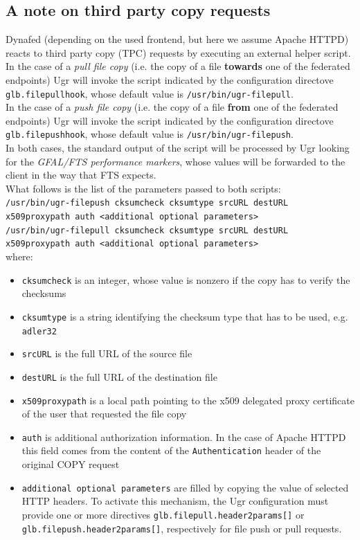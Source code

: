 \documentclass[12pt]{article} %
\begin{document}
\subsection{\label{noteonTPC}A note on third party copy requests}
Dynafed (depending on the used frontend, but here we assume Apache HTTPD) reacts to third party copy (TPC) requests by
executing an external helper script.\\
In the case of a \textit{pull file copy} (i.e. the copy of a file \textbf{towards} one of the federated endpoints) Ugr will invoke the script
indicated by the configuration directove \lstinline"glb.filepullhook", whose default value is \lstinline"/usr/bin/ugr-filepull".\\
In the case of a \textit{push file copy} (i.e. the copy of a file \textbf{from} one of the federated endpoints) Ugr will invoke the script
indicated by the configuration directove \lstinline"glb.filepushhook", whose default value is \lstinline"/usr/bin/ugr-filepush".\\
In both cases, the standard output of the script will be processed by Ugr looking for the \textit{GFAL/FTS performance markers}, whose
values will be forwarded to the client in the way that FTS expects.\\
What follows is the list of the parameters passed to both scripts:\\
\lstinline"/usr/bin/ugr-filepush cksumcheck cksumtype srcURL destURL x509proxypath auth <additional optional parameters>"\\
\lstinline"/usr/bin/ugr-filepull cksumcheck cksumtype srcURL destURL x509proxypath auth <additional optional parameters>"\\
where:\\
\begin{itemize}
 \item \lstinline"cksumcheck" is an integer, whose value is nonzero if the copy has to verify the checksums
 \item \lstinline"cksumtype" is a string identifying the checksum type that has to be used, e.g. \lstinline"adler32"
 \item \lstinline"srcURL" is the full URL of the source file
 \item \lstinline"destURL" is the full URL of the destination file
 \item \lstinline"x509proxypath" is a local path pointing to the x509 delegated proxy certificate of the user that requested the file copy
 \item \lstinline"auth" is additional authorization information. In the case of Apache HTTPD this field comes from the
 content of the \lstinline"Authentication" header of the original COPY request
 \item \lstinline"additional optional parameters" are filled by copying the value of selected HTTP
 headers. To activate this mechanism, the Ugr configuration must provide one or more directives
 \lstinline"glb.filepull.header2params[]" or \lstinline"glb.filepush.header2params[]", respectively for file push or pull requests.
\end{itemize}
\end{document}
